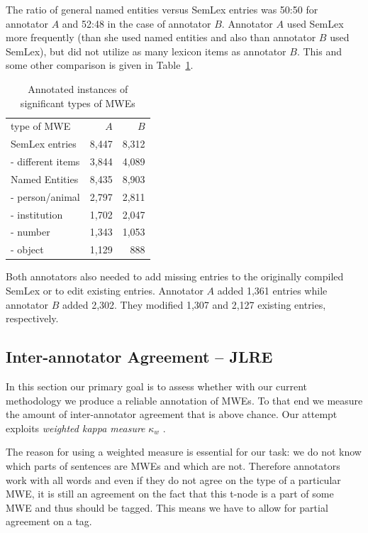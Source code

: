 The ratio of general named entities versus SemLex entries was 50:50 for annotator $A$ and 52:48 in the case of annotator $B$. Annotator $A$ used SemLex more frequently (than she used named entities and also than annotator $B$ used SemLex), but did not utilize as many lexicon items as annotator $B$.
This and some other comparison is given in Table~\ref{tab:anot}.


\begin{table}[h]
\centering
\begin{tabular}{l|r|r}
type of MWE&$A$&$B$\\
\cline{1-3}
SemLex entries&8,447&8,312\\
 - different items&3,844&4,089\\
Named Entities&8,435&8,903\\
 - person/animal&2,797&2,811\\
 - institution&1,702&2,047\\
 - number&1,343&1,053\\
 - object&1,129&888\\
\end{tabular}
\caption{Annotated instances \newline of significant types of MWEs}
\label{tab:anot}
\end{table}

Both annotators also needed to add missing entries to the originally compiled SemLex or to edit existing entries. Annotator $A$ added 1,361 entries while annotator $B$ added 2,302. They modified 1,307 and 2,127 existing entries, respectively.


\subsection{Inter-annotator Agreement – JLRE}
\label{agreement}

In this section our primary goal is to assess whether with our current methodology we produce a reliable annotation of MWEs. To that end we measure the amount of inter-annotator agreement that is above chance. Our attempt exploits {\it weighted kappa measure} $\kappa_w$ \cite{cohen:1968}.

The reason for using a weighted measure is essential for our task: we do not know which parts of sentences are MWEs and which are not. Therefore annotators work with all words and even if they do not agree on the type of a particular MWE, it is still an agreement on the fact that this t-node is a part of some MWE and thus should be tagged. This means we have to allow for partial agreement on a tag.

